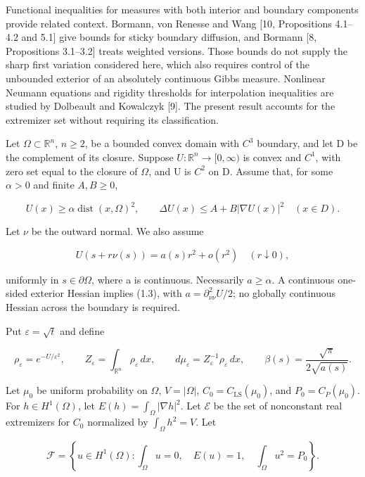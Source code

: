 \documentclass[11pt]{article}
\begin{document}
Functional inequalities for measures with both interior and boundary
components provide related context. Bormann, von Renesse and Wang {[}10,
Propositions 4.1--4.2 and 5.1{]} give bounds for sticky boundary
diffusion, and Bormann {[}8, Propositions 3.1--3.2{]} treats weighted
versions. Those bounds do not supply the sharp first variation
considered here, which also requires control of the unbounded exterior
of an absolutely continuous Gibbs measure. Nonlinear Neumann equations
and rigidity thresholds for interpolation inequalities are studied by
Dolbeault and Kowalczyk {[}9{]}. The present result accounts for the
extremizer set without requiring its classification.

Let \(\Omega \subset \mathbb{R}^n\), \(n\geq 2\), be a bounded convex
domain with \(C^{3}\) boundary, and let D be the complement of its
closure. Suppose \(U:\mathbb{R}^n\to [0,\infty )\) is convex and
\(C^{1}\), with zero set equal to the closure of \(\Omega\), and U is
\(C^{2}\) on D. Assume that, for some \(\alpha >0\) and finite
\(A,B\geq 0\),

\[U(x)\geq\alpha\operatorname{dist}(x,\Omega)^2,
\qquad\Delta U(x)\leq A+B|\nabla U(x)|^2\quad(x\in D).\tag{1.2}\]

Let \(\nu\) be the outward normal. We also assume

\[U(s+r\nu(s))=a(s)r^2+o(r^2)\quad(r\downarrow0),\tag{1.3}\]

uniformly in \(s\in \partial \Omega\), where a is continuous.
Necessarily \(a\geq \alpha\). A continuous one-sided exterior Hessian
implies (1.3), with \(a=\partial ^{2}_{\nu \nu }U/2\); no globally
continuous Hessian across the boundary is required.

Put \(\varepsilon =\sqrt{t}\) and define

\[\rho_\varepsilon=e^{-U/\varepsilon^2},\qquad
Z_\varepsilon=\int_{\mathbb R^n}\rho_\varepsilon\,dx,\qquad
d\mu_\varepsilon=Z_\varepsilon^{-1}\rho_\varepsilon\,dx,
\qquad\beta(s)=\frac{\sqrt\pi}{2\sqrt{a(s)}}.\tag{1.4}\]

Let \(\mu _0\) be uniform probability on \(\Omega\), \(V=|\Omega |\),
\(C_0=C_{\mathrm{LS}}(\mu _0)\), and \(P_0=C_P(\mu _0)\). For
\(h\in H^{1}(\Omega )\), let \(E(h)=\int _\Omega |\nabla h|^{2}\). Let
\(\mathcal{E}\) be the set of nonconstant real extremizers for \(C_0\)
normalized by \(\int _\Omega h^{2}=V\). Let

\[\mathcal F=\left\{u\in H^1(\Omega):
\int_\Omega u=0,\quad E(u)=1,\quad\int_\Omega u^2=P_0\right\}.\tag{1.5}\]
\end{document}
